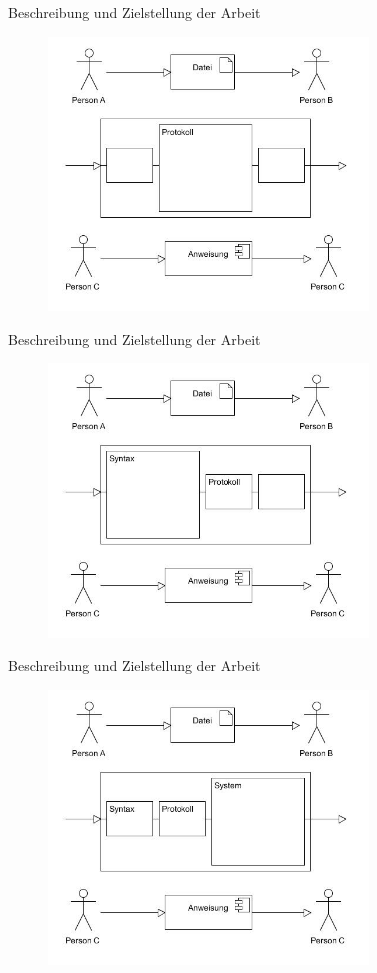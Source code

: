 \documentclass{beamer}
\begin{document}
\begin{frame}{Beschreibung und Zielstellung der Arbeit}
\begin{figure}
\includegraphics[width=8.5cm]{s3.jpg}
\end{figure}
\end{frame}

\begin{frame}{Beschreibung und Zielstellung der Arbeit}
\begin{figure}
\includegraphics[width=8.5cm]{s4.jpg}
\end{figure}
\end{frame}

\begin{frame}{Beschreibung und Zielstellung der Arbeit}
\begin{figure}
\includegraphics[width=8.5cm]{s5.jpg}
\end{figure}
\end{frame}
\end{document}
